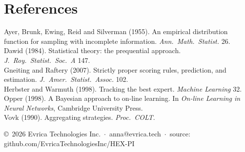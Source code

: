 \documentclass[10.5pt]{article}
\begin{document}
\section*{References}
{\small
Ayer, Brunk, Ewing, Reid and Silverman (1955). An empirical distribution function for sampling with incomplete information. \emph{Ann.\ Math.\ Statist.} 26.\\
Dawid (1984). Statistical theory: the prequential approach. \emph{J.\ Roy.\ Statist.\ Soc.\ A} 147.\\
Gneiting and Raftery (2007). Strictly proper scoring rules, prediction, and estimation. \emph{J.\ Amer.\ Statist.\ Assoc.} 102.\\
Herbster and Warmuth (1998). Tracking the best expert. \emph{Machine Learning} 32.\\
Opper (1998). A Bayesian approach to on-line learning. In \emph{On-line Learning in Neural Networks}, Cambridge University Press.\\
Vovk (1990). Aggregating strategies. \emph{Proc.\ COLT}.
}

\vfill
{\footnotesize\color{rule} \copyright\ 2026 Evrica Technologies Inc. \,$\cdot$\, anna@evrica.tech \,$\cdot$\, source: github.com/EvricaTechnologiesInc/HEX-PI}
\end{document}
